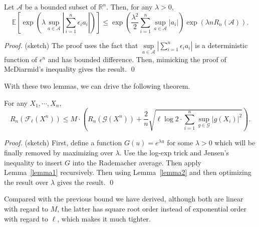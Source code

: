\documentclass[12pt]{llncs}
\newcommand{\E}[1]{\mathbb{E}\left[#1\right]}
\newcommand{\F}{\mathcal{F}}
\newcommand{\reals}{\mathbb{R}}
\begin{document}
\begin{lemma}
  \label{lemma2}
  Let $\mathcal{A}$ be a bounded subset of $\reals^n$. Then, for any $\lambda > 0$, $$\E{\exp\left(\lambda \sup\limits_{a \in \mathcal{A}}\left|\sum_{i=1}^{n}\epsilon_i a_i\right|\right)} \leq \exp\left(\frac{\lambda^2}{2}\sum_{i=1}^{n}\sup\limits_{a \in \mathcal{A}}|a_i|\right)\exp\left(\lambda n R_n(\mathcal{A})\right).$$
\end{lemma}
\begin{proof}(sketch) The proof uses the fact that $\sup\limits_{a \in \mathcal{A}}\left|\sum_{i=1}^{n}\epsilon_i a_i\right|$ is a deterministic function of $\epsilon^n$ and has bounded difference. Then, mimicking the proof of McDiarmid's inequality gives the result. \qed
\end{proof}

With these two lemmas, we can drive the following theorem.
\begin{theorem}
  For any $X_1, \cdots, X_n$, $$R_n(\F_\ell(X^n)) \leq M \cdot \left(R_n(\mathcal{G}(X^n)) + \frac{2}{n}\sqrt{\ell \log 2 \cdot \sum_{i=1}^{n}\sup\limits_{g \in \mathcal{G}}|g(X_i)|^2}\right).$$
\end{theorem}
\begin{proof} (sketch) First, define a function $G(u) = e^{\lambda u}$ for some $\lambda > 0$ which will be finally removed by maximizing over $\lambda$. Use the log-exp trick and Jensen's inequality to insert $G$ into the Rademacher average. Then apply Lemma~\ref{lemma1} recursively. Then using Lemma~\ref{lemma2} and then optimizing the result over $\lambda$ gives the result. \qed
\end{proof}

Compared with the previous bound we have derived, although both are linear with regard to $M$, the latter has square root order instead of exponential order with regard to $\ell$, which makes it much tighter.


\end{document}
